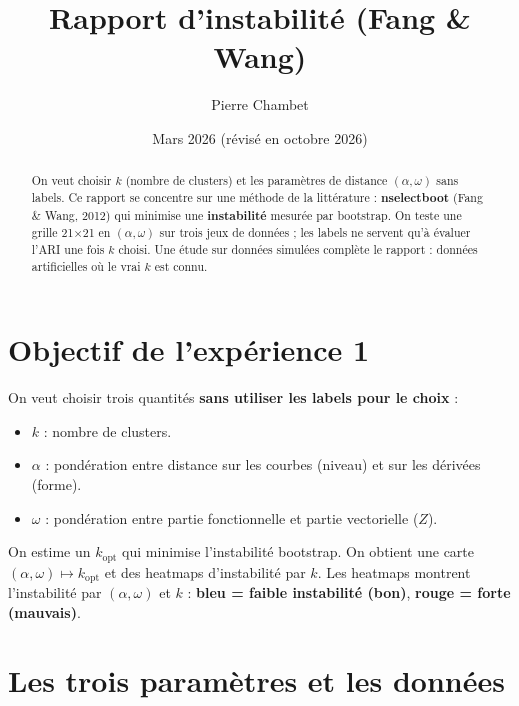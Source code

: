 \documentclass[11pt, a4paper]{article}
\title{Rapport d'instabilité (Fang \& Wang)}
\author{Pierre Chambet}
\date{Mars 2026 (révisé en octobre 2026)}
\begin{document}
\maketitle

\begin{abstract}
On veut choisir $k$ (nombre de clusters) et les paramètres de distance
$(\alpha,\omega)$ sans labels. Ce rapport se concentre sur une méthode de la
littérature : \textbf{nselectboot} (Fang \& Wang, 2012) qui minimise une \textbf{instabilité} mesurée par
bootstrap. On teste une grille 21×21 en
$(\alpha,\omega)$ sur trois jeux de données ; les labels ne servent qu'à
évaluer l'ARI une fois $k$ choisi. Une étude sur données simulées complète le rapport : données artificielles
où le vrai $k$ est connu.
\end{abstract}

\tableofcontents
\newpage

\section{Objectif de l'expérience 1}

On veut choisir trois quantités \textbf{sans utiliser les labels pour le choix} :

\begin{itemize}
  \item \textbf{$k$} : nombre de clusters.
  \item \textbf{$\alpha$} : pondération entre distance sur les courbes (niveau)
    et sur les dérivées (forme).
  \item \textbf{$\omega$} : pondération entre partie fonctionnelle et partie
    vectorielle ($Z$).
\end{itemize}

On estime un $k_\text{opt}$ qui minimise l'instabilité bootstrap.
On obtient une carte $(\alpha,\omega) \mapsto k_\text{opt}$ et des heatmaps
d'instabilité par $k$. Les heatmaps montrent l'instabilité par $(\alpha,\omega)$
et $k$ : \textbf{bleu = faible instabilité (bon)}, \textbf{rouge = forte (mauvais)}.

\section{Les trois paramètres et les données}
\end{document}
